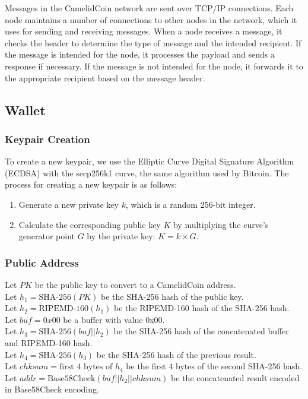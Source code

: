 \documentclass{article}
\begin{document}
Messages in the CamelidCoin network are sent over TCP/IP connections.
Each node maintains a number of connections to other nodes in the network, which it uses for sending and receiving messages.
When a node receives a message, it checks the header to determine the type of message and the intended recipient.
If the message is intended for the node, it processes the payload and sends a response if necessary.
If the message is not intended for the node, it forwards it to the appropriate recipient based on the message header.
\subsection{Wallet}
\subsubsection{Keypair Creation}
To create a new keypair, we use the Elliptic Curve Digital Signature Algorithm (ECDSA) with the secp256k1 curve, the same algorithm used by Bitcoin. The process for creating a new keypair is as follows:

\begin{enumerate}
\item Generate a new private key $k$, which is a random 256-bit integer.
\item Calculate the corresponding public key $K$ by multiplying the curve's generator point $G$ by the private key: $K = k \times G$.
\end{enumerate}
\subsubsection{Public Address}

Let $PK$ be the public key to convert to a CamelidCoin address.\\
Let $h_1 = \text{SHA-256}(PK)$ be the SHA-256 hash of the public key.\\
Let $h_2 = \text{RIPEMD-160}(h_1)$ be the RIPEMD-160 hash of the SHA-256 hash.\\
Let $buf = 0x00$ be a buffer with value 0x00.\\
Let $h_3 = \text{SHA-256}(buf || h_2)$ be the SHA-256 hash of the concatenated buffer and RIPEMD-160 hash.\\
Let $h_4 = \text{SHA-256}(h_3)$ be the SHA-256 hash of the previous result.\\
Let $chksum = \text{first 4 bytes of } h_4$ be the first 4 bytes of the second SHA-256 hash.\\
Let $addr = \text{Base58Check}(buf || h_2 || chksum)$ be the concatenated result encoded in Base58Check encoding.\\
\end{document}
